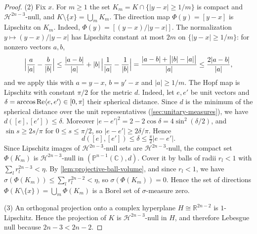 \begin{proof}
(2) Fix $x$. For $m\geq1$ the set $K_m=K\cap\{|y-x|\geq1/m\}$ is compact and $\mathcal H^{2n-3}$-null, and $K\setminus\{x\}=\bigcup_mK_m$. The direction map $\Phi(y)=[y-x]$ is Lipschitz on $K_m$. Indeed, $\Phi(y)=[(y-x)/|y-x|]$. The normalization $y\mapsto(y-x)/|y-x|$ has Lipschitz constant at most $2m$ on $\{|y-x|\geq1/m\}$: for nonzero vectors $a,b$,
\[
 \Bigl|\frac a{|a|}-\frac b{|b|}\Bigr|\leq\frac{|a-b|}{|a|}+|b|\,\Bigl|\frac1{|a|}-\frac1{|b|}\Bigr|=\frac{|a-b|+\bigl||b|-|a|\bigr|}{|a|}\leq\frac{2|a-b|}{|a|},
\]
and we apply this with $a=y-x$, $b=y'-x$ and $|a|\geq1/m$. The Hopf map is Lipschitz with constant $\pi/2$ for the metric $d$. Indeed, let $e,e'$ be unit vectors and $\delta=\arccos\operatorname{Re}\langle e,e'\rangle\in[0,\pi]$ their spherical distance. Since $d$ is the minimum of the spherical distance over the unit representatives (\cref{sec:unitary-measures}), we have $d([e],[e'])\leq\delta$. Moreover $|e-e'|^2=2-2\cos\delta=4\sin^2(\delta/2)$, and $\sin s\geq2s/\pi$ for $0\leq s\leq\pi/2$, so $|e-e'|\geq2\delta/\pi$. Hence
\[
 d([e],[e'])\leq\delta\leq\tfrac\pi2|e-e'|.
\]
Since Lipschitz images of $\mathcal H^{2n-3}$-null sets are $\mathcal H^{2n-3}$-null, the compact set $\Phi(K_m)$ is $\mathcal H^{2n-3}$-null in $(\mathbb P^{n-1}(\mathbb C),d)$. Cover it by balls of radii $r_l<1$ with $\sum_lr_l^{2n-3}<\eta$. By \cref{lem:projective-ball-volume}, and since $r_l<1$, we have $\sigma(\Phi(K_m))\leq\sum_lr_l^{2n-2}<\eta$, so $\sigma(\Phi(K_m))=0$. Hence the set of directions $\Phi(K\setminus\{x\})=\bigcup_m\Phi(K_m)$ is a Borel set of $\sigma$-measure zero.

(3) An orthogonal projection onto a complex hyperplane $H\cong\mathbb R^{2n-2}$ is $1$-Lipschitz. Hence the projection of $K$ is $\mathcal H^{2n-3}$-null in $H$, and therefore Lebesgue null because $2n-3<2n-2$.
\end{proof}

